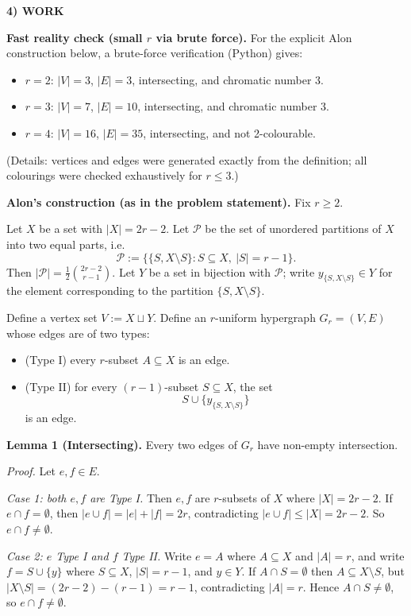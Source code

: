 \medskip
\noindent\textbf{4) WORK}

\textbf{Fast reality check (small $r$ via brute force).}
For the explicit Alon construction below, a brute-force verification (Python) gives:
\begin{itemize}
\item $r=2$: $|V|=3$, $|E|=3$, intersecting, and chromatic number $3$.
\item $r=3$: $|V|=7$, $|E|=10$, intersecting, and chromatic number $3$.
\item $r=4$: $|V|=16$, $|E|=35$, intersecting, and not 2-colourable.
\end{itemize}
(Details: vertices and edges were generated exactly from the definition; all colourings were checked exhaustively for $r\le 3$.)

\medskip
\noindent\textbf{Alon's construction (as in the problem statement).}
Fix $r\ge 2$.

Let $X$ be a set with $|X|=2r-2$.
Let $\mathcal P$ be the set of unordered partitions of $X$ into two equal parts, i.e.
\[
\mathcal P:=\big\{\{S, X\setminus S\}: S\subseteq X,\ |S|=r-1\big\}.
\]
Then $|\mathcal P|=\frac12\binom{2r-2}{r-1}$.
Let $Y$ be a set in bijection with $\mathcal P$; write $y_{\{S,X\setminus S\}}\in Y$ for the element corresponding to the partition $\{S,X\setminus S\}$.

Define a vertex set $V:=X\sqcup Y$.
Define an $r$-uniform hypergraph $G_r=(V,E)$ whose edges are of two types:
\begin{itemize}
\item (Type I) every $r$-subset $A\subseteq X$ is an edge.
\item (Type II) for every $(r-1)$-subset $S\subseteq X$, the set
\[
S\cup\{y_{\{S,X\setminus S\}}\}
\]
is an edge.
\end{itemize}

\medskip
\noindent\textbf{Lemma 1 (Intersecting).}
Every two edges of $G_r$ have non-empty intersection.

\noindent\emph{Proof.}
Let $e,f\in E$.

\emph{Case 1: both $e,f$ are Type I.}
Then $e,f$ are $r$-subsets of $X$ where $|X|=2r-2$.
If $e\cap f=\emptyset$, then $|e\cup f|=|e|+|f|=2r$, contradicting $|e\cup f|\le |X|=2r-2$.
So $e\cap f\neq\emptyset$.

\emph{Case 2: $e$ Type I and $f$ Type II.}
Write $e=A$ where $A\subseteq X$ and $|A|=r$, and write $f=S\cup\{y\}$ where $S\subseteq X$, $|S|=r-1$, and $y\in Y$.
If $A\cap S=\emptyset$ then $A\subseteq X\setminus S$, but $|X\setminus S|=(2r-2)-(r-1)=r-1$, contradicting $|A|=r$.
Hence $A\cap S\neq\emptyset$, so $e\cap f\neq\emptyset$.

